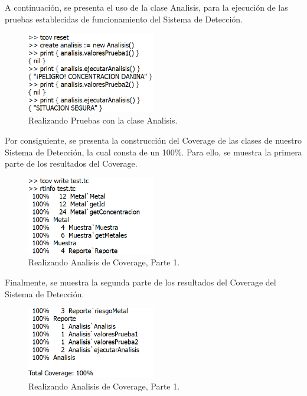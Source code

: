 A continuación, se presenta el uso de la clase Analisis, para la ejecución de las pruebas establecidas de funcionamiento del Sistema de Detección.
\begin{figure}[h]
    \centering
    \includegraphics[width=0.5\textwidth]{Recursos/RealizandoPruebas.png}
    \caption{Realizando Pruebas con la clase Analisis.}
\end{figure}


Por consiguiente, se presenta la construcción del Coverage de las clases de nuestro Sistema de Detección, la cual consta de un 100\%. Para ello, se muestra la primera parte de los resultados del Coverage.
\begin{figure}[h]
    \centering
    \includegraphics[width=0.5\textwidth]{Recursos/AnalisisCoverage1.png}
    \caption{Realizando Analisis de Coverage, Parte 1.}
\end{figure}

Finalmente, se muestra la segunda parte de los resultados del Coverage del Sistema de Detección.

\begin{figure}[h]
    \centering
    \includegraphics[width=0.5\textwidth]{Recursos/AnalisisCoverage2.png}
    \caption{Realizando Analisis de Coverage, Parte 1.}
\end{figure}

\newpage